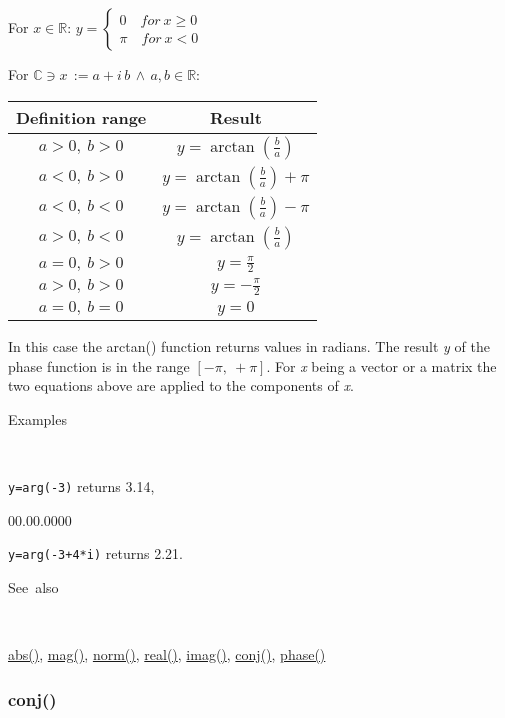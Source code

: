 \medskip{}
For $x\in\mathbb{R}$: $y=\left\{ \begin{array}{l}
0\quad for\: x\geq0\\
\pi\quad for\: x<0\end{array}\right.$
\medskip{}

For $\mathbb{\mathbb{C}}\ni x\,:=a+i\, b\,\wedge\, a,b\in\mathbb{R}$:

\medskip{}
\begin{tabular}{|c|c|}
\hline 
Definition range&
Result\tabularnewline
\hline
\hline 
$a>0,\: b>0$&
$y=\arctan\left(\frac{b}{a}\right)$\tabularnewline
\hline 
$a<0,\: b>0$&
$y=\arctan\left(\frac{b}{a}\right)+\pi$\tabularnewline
\hline 
$a<0,\: b<0$&
$y=\arctan\left(\frac{b}{a}\right)-\pi$\tabularnewline
\hline 
$a>0,\: b<0$&
$y=\arctan\left(\frac{b}{a}\right)$\tabularnewline
\hline 
$a=0,\: b>0$&
$y=\frac{\pi}{2}$\tabularnewline
\hline 
$a>0,\: b>0$&
$y=-\frac{\pi}{2}$\tabularnewline
\hline 
$a=0,\: b=0$&
$y=0$\tabularnewline
\hline
\end{tabular}
\medskip{}

In this case the arctan() function returns values in radians. The
result \textit{y} of the phase function is in the range $\left[-\pi,\:+\pi\right]$.
For \textit{x} being a vector or a matrix the two equations above
are applied to the components of \textit{x}.

\begin{description}
\item [Examples]~
\end{description}
\texttt{y=arg(-3)} returns 3.14,

\begin{lyxlist}{00.00.0000}
\item [\texttt{y=arg(-3+4{*}i)}]returns 2.21.
\end{lyxlist}
\begin{description}
\item [See~also]~
\end{description}
\textcolor{blue}{\hyperlink{abs}{abs()}}, \textcolor{blue}{\hyperlink{mag}{mag()}},
\textcolor{blue}{\hyperlink{norm}{norm()}}, \textcolor{blue}{\hyperlink{real}{real()}},
\textcolor{blue}{\hyperlink{imag}{imag()}}, \textcolor{blue}{\hyperlink{conj}{conj()}},
\textcolor{blue}{\hyperlink{phase}{phase()}}


\newpage
\subsubsection*{\hypertarget{conj}{}{\Large conj()}}


